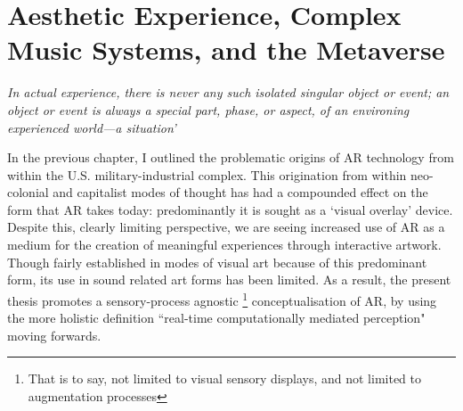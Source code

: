 \chapter{Aesthetic Experience, Complex Music Systems, and the Metaverse}
\label{sec: theory}
\epigraph{\emph{In actual experience, there is never any such isolated singular object or event; an object or event is always a special part, phase, or aspect, of an environing experienced world—a situation'}}{\citep[p. 67]{dewey1934}}
In the previous chapter, I outlined the problematic origins of AR technology from within the U.S. military-industrial complex. This origination from within neo-colonial and capitalist modes of thought has had a compounded effect on the form that AR takes today: predominantly it is sought as a `visual overlay' device. Despite this, clearly limiting perspective, we are seeing increased use of AR as a medium for the creation of meaningful experiences through interactive artwork. Though fairly established in modes of visual art because of this predominant form, its use in sound related art forms has been limited. As a result, the present thesis promotes a sensory-process agnostic \footnote{That is to say, not limited to visual sensory displays, and not limited to augmentation processes} conceptualisation of AR, by using the more holistic definition ``real-time computationally mediated perception" \citep{kiefer2018} moving forwards. 

